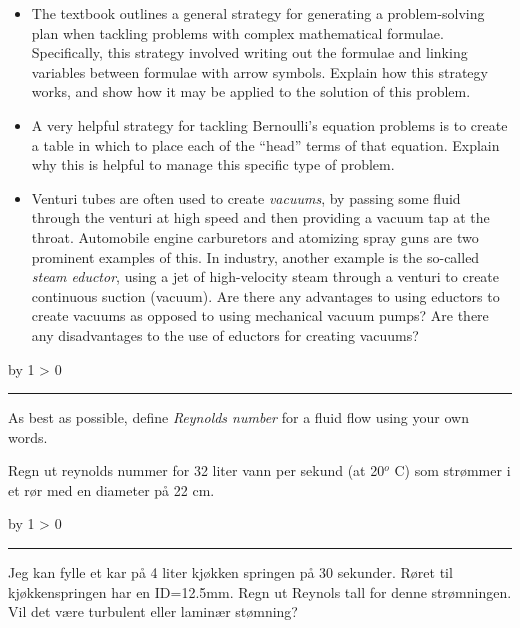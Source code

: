 \documentclass[12pt,a4paper]{article}
\def\oppgave{
            \advance\questnum by 1
            \ifnum \questnum > 0
                 \hrule
                 \vskip 3pt
                 \leftline{Oppgave \the\questnum}
                 \vskip 3pt \fi}
\begin{document}
\begin{itemize}
\item{} The textbook outlines a general strategy for generating a problem-solving plan when tackling problems with complex mathematical formulae.  Specifically, this strategy involved writing out the formulae and linking variables between formulae with arrow symbols.  Explain how this strategy works, and show how it may be applied to the solution of this problem.
\item{} A very helpful strategy for tackling Bernoulli's equation problems is to create a table in which to place each of the ``head'' terms of that equation.  Explain why this is helpful to manage this specific type of problem.
\item{} Venturi tubes are often used to create {\it vacuums}, by passing some fluid through the venturi at high speed and then providing a vacuum tap at the throat.  Automobile engine carburetors and atomizing spray guns are two prominent examples of this.  In industry, another example is the so-called {\it steam eductor}, using a jet of high-velocity steam through a venturi to create continuous suction (vacuum).  Are there any advantages to using eductors to create vacuums as opposed to using mechanical vacuum pumps?  Are there any disadvantages to the use of eductors for creating vacuums?
\end{itemize}

\vskip 10pt \filbreak 
\oppgave{} 

As best as possible, define {\it Reynolds number} for a fluid flow using your own words.

\vskip 10pt

Regn ut reynolds nummer for 32 liter vann per sekund (at 20$^{o}$ C) som strømmer i et rør med en diameter på 22 cm. 


\vskip 10pt \filbreak 
\oppgave{} 

Jeg kan fylle et kar på 4 liter kjøkken springen på 30 sekunder. Røret til kjøkkenspringen har en ID=12.5mm. Regn ut Reynols tall for denne strømningen. Vil det være turbulent eller laminær stømning?
\end{document}
